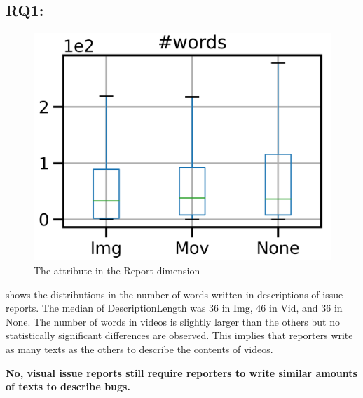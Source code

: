 

\subsection*{RQ1: \RQone{}}
\begin{figure}[t]
    \centering
    \includegraphics[width=0.5\linewidth]{./figures/words.png}
    \caption{The attribute in the Report dimension}
    \label{fig:words}
\end{figure}
 shows the distributions in the number of words 
written in descriptions of issue reports. 
The median of DescriptionLength was 36 in Img, 
46 in Vid, and 36 in None. 
The number of words in videos is slightly larger than 
the others but no statistically significant differences are observed. 
This implies that reporters write as many texts as the others 
to describe the contents of videos. 

\summarybox
{\bf No, visual issue reports still require reporters 
to write similar amounts of texts to describe bugs. 
}

